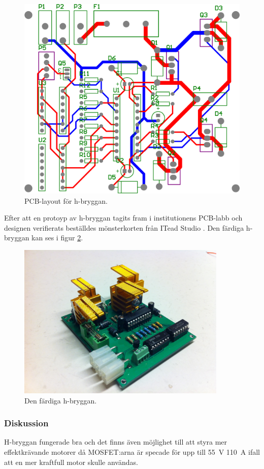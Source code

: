 \begin{figure}[htbp!]
\centering
\includegraphics[width=12cm]{../../includes/figures/H_brygga_pcb}
\caption{PCB-layout för h-bryggan.}
\label{fig:pcb_layout}
\end{figure}

Efter att en protoyp av h-bryggan tagits fram i institutionens PCB-labb och
designen verifierats beställdes mönsterkorten från ITead Studio \cite{ITead Studio}. Den färdiga h-bryggan kan ses i figur \ref{fig:mounted_h_bridge}.

\begin{figure}[htbp!]
\centering
\includegraphics[width=10cm]{../../includes/figures/Hbridge}
\caption{Den färdiga h-bryggan.}
\label{fig:mounted_h_bridge}
\end{figure}

\subsubsection{Diskussion}
H-bryggan fungerade bra och det finns även möjlighet till att styra mer
effektkrävande motorer då MOSFET:arna är specade för upp till 55~V 110~A ifall
att en mer kraftfull motor skulle användas.

